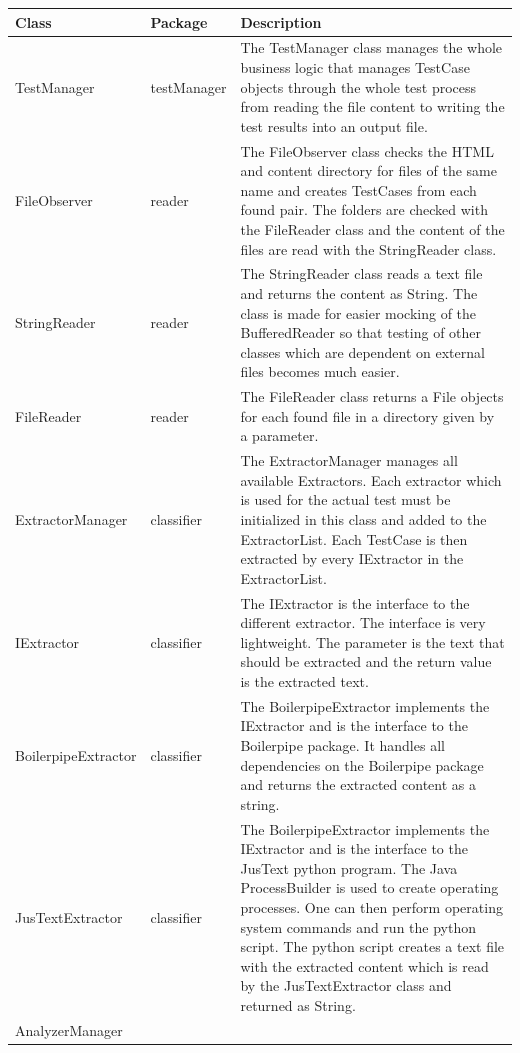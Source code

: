\begin{longtable}{p{4cm}|p{2cm}|p{8cm}}
\hline
\textbf{Class} &
\textbf{Package} &
\textbf{Description}
 \\ \hline
TestManager &
testManager &
The TestManager class manages the whole business logic that manages TestCase objects through the whole test process from reading the file content to writing the test results into an output file.
 \\ \hline
FileObserver &
reader &
The FileObserver class checks the HTML and content directory for files of the same name and creates TestCases from each found pair. The folders are checked with the FileReader class and the content of the files are read with the StringReader class.
\\ \hline
StringReader &
reader &
The StringReader class reads a text file and returns the content as String. The class is made for easier mocking of the BufferedReader so that testing of other classes which are dependent on external files becomes much easier.
\\ \hline
FileReader &
reader &
The FileReader class returns a File objects for each found file in a directory given by a parameter.
\\ \hline
ExtractorManager &
classifier &
The ExtractorManager manages all available Extractors. Each extractor which is used for the actual test must be initialized in this class and added to the ExtractorList. Each TestCase is then extracted by every IExtractor in the ExtractorList.
\\ \hline
IExtractor &
classifier &
The IExtractor is the interface to the different extractor. The interface is very lightweight. The parameter is the text that should be extracted and the return value is the extracted text.
\\ \hline
BoilerpipeExtractor &
classifier &
The BoilerpipeExtractor implements the IExtractor and is the interface to the Boilerpipe package. It handles all dependencies on the Boilerpipe package and returns the extracted content as a string.
\\ \hline
JusTextExtractor &
classifier &
The BoilerpipeExtractor implements the IExtractor and is the interface to the JusText python program. The Java ProcessBuilder is used to create operating processes. One can then perform operating system commands and run the python script. The python script creates a text file with the extracted content which is read by the JusTextExtractor class and returned as String.
\\ \hline
AnalyzerManager &          

\end{longtable}
